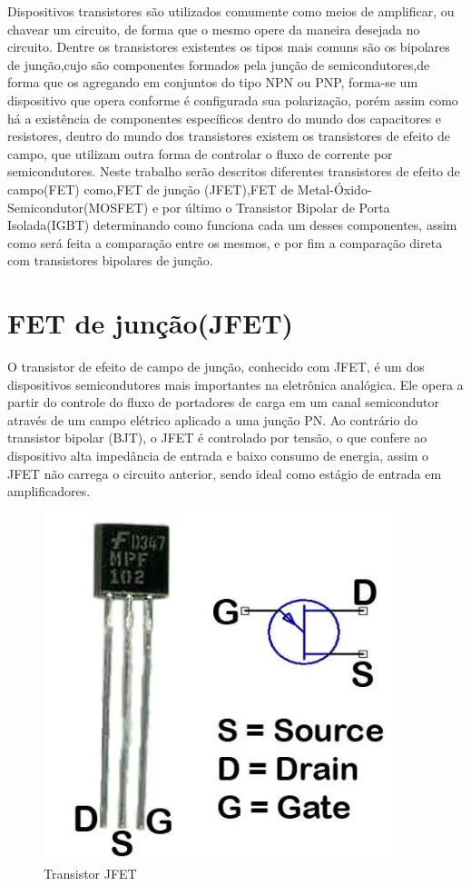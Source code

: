 \documentclass[12pt]{article}
\begin{document}
    Dispositivos transistores são utilizados comumente como meios de amplificar, ou chavear um circuito, de forma que o mesmo opere da maneira desejada no circuito. Dentre os transistores existentes os tipos mais comuns são os bipolares de junção,cujo são componentes formados pela junção de semicondutores,de forma que os agregando em conjuntos do tipo NPN ou PNP, forma-se um dispositivo que opera conforme é configurada sua polarização, porém assim como há a existência de componentes específicos dentro do mundo dos capacitores e resistores, dentro do mundo dos transistores existem os transistores de efeito de campo, que utilizam outra forma de controlar o fluxo de corrente por semicondutores. Neste trabalho serão descritos diferentes transistores de efeito de campo(FET) como,FET de junção (JFET),FET de Metal-Óxido-Semicondutor(MOSFET) e por último o Transistor Bipolar de Porta Isolada(IGBT) determinando como funciona cada um desses componentes, assim como será feita a comparação entre os mesmos, e por fim a comparação direta com transistores bipolares de junção.

\newpage


\section{FET de junção(JFET)}

O transistor de efeito de campo de junção, conhecido com JFET, é um dos dispositivos semicondutores mais importantes na eletrônica analógica. Ele opera a partir do controle do fluxo de portadores de carga em um canal semicondutor através de um campo elétrico aplicado a uma junção PN. Ao contrário do transistor bipolar (BJT), o JFET é controlado por tensão, o que confere ao dispositivo alta impedância de entrada e baixo consumo de energia, assim o JFET não carrega o circuito anterior, sendo ideal como estágio de entrada em amplificadores.

        \begin{figure}[htpb!]
            \centering
            \includegraphics[width=0.3\linewidth]{images/Captura de tela 2025-10-18 223003.png}
            \caption{Transistor JFET}
        \end{figure}
\end{document}
